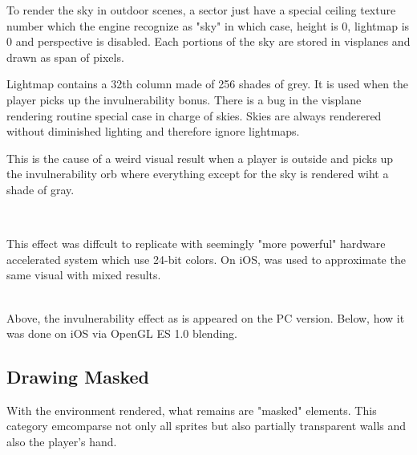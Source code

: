 To render the sky in outdoor scenes, a sector just have a special ceiling texture number which the engine recognize as "sky" in which case, height is 0, lightmap is 0 and perspective is disabled. Each portions of the sky are stored in visplanes and drawn as span of pixels.\\
\par
Lightmap  contains a 32th column made of 256 shades of grey. It is used when the player picks up the invulnerability bonus. There is a bug in the visplane rendering routine special case in charge of skies. Skies are always renderered without diminished lighting and therefore ignore lightmaps.\\
\par
 This is the cause of a weird visual result when a player is outside and picks up the invulnerability orb where everything except for the sky is rendered wiht a shade of gray.\\
\par 
{}\\
\par
This effect was diffcult to replicate with seemingly "more powerful" hardware accelerated system which use 24-bit colors. On iOS,  was used to approximate the same visual with mixed results.\\



\\
\par
Above, the invulnerability effect as is appeared on the PC version. Below, how it was done on iOS via OpenGL ES 1.0 blending.\\
\par
{} 














\subsection{Drawing Masked}
With the environment rendered, what remains are "masked" elements. This category emcomparse not only all sprites but also partially transparent walls and also the player's hand.\\
 \par



